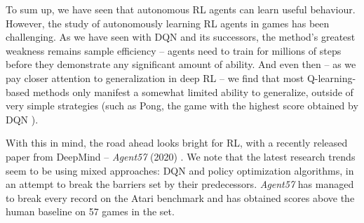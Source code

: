 To sum up, we have seen that autonomous RL agents can learn useful behaviour.
However, the study of autonomously learning RL agents in games has been challenging.
As we have seen with DQN and its successors, the method's greatest weakness remains sample efficiency -- agents need to train for millions of steps before they demonstrate any significant amount of ability.
And even then -- as we pay closer attention to generalization in deep RL -- we find that most Q-learning-based methods only manifest a somewhat limited ability to generalize, outside of very simple strategies (such as Pong, the game with the highest score obtained by DQN \cite{atari-dqn}).

With this in mind, the road ahead looks bright for RL, with a recently released paper from DeepMind – \emph{Agent57} (2020) \cite{agent57-paper}. We note that the latest research trends seem to be using mixed approaches: DQN and policy optimization algorithms, in an attempt to break the barriers set by their predecessors.
\emph{Agent57} has managed to break every record on the Atari benchmark and has obtained scores above the human baseline on 57 games in the set.